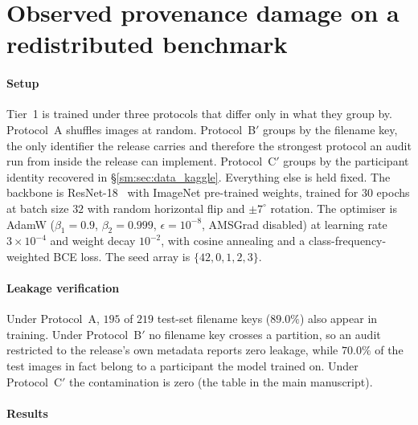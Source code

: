 \documentclass[11pt]{article}
\begin{document}
\section{Observed provenance damage on a redistributed benchmark}
\label{sm:sec:exp1}

\paragraph{Setup}
Tier~1 is trained under three protocols that differ only in what they
group by. Protocol~A shuffles images at random. Protocol~B$'$ groups by
the filename key, the only identifier the release carries and therefore
the strongest protocol an audit run from inside the release can
implement. Protocol~C$'$ groups by the participant identity recovered in
\S\ref{sm:sec:data_kaggle}. Everything else is held fixed. The backbone is
ResNet-18~\cite{he2016} with ImageNet pre-trained weights, trained for $30$
epochs at batch size $32$ with random horizontal flip and $\pm 7^\circ$
rotation. The optimiser is AdamW ($\beta_1 = 0.9$, $\beta_2 = 0.999$,
$\epsilon = 10^{-8}$, AMSGrad disabled) at learning rate
$3 \times 10^{-4}$ and weight decay $10^{-2}$, with cosine annealing and a
class-frequency-weighted BCE loss. The seed array is $\{42, 0, 1, 2, 3\}$.

\paragraph{Leakage verification}
Under Protocol~A, $195$ of $219$ test-set filename keys ($89.0\%$) also
appear in training. Under Protocol~B$'$ no filename key crosses a
partition, so an audit restricted to the release's own metadata reports
zero leakage, while $70.0\%$ of the test images in fact belong to a
participant the model trained on. Under Protocol~C$'$ the contamination
is zero (the table in the main manuscript).

\paragraph{Results}
\end{document}
